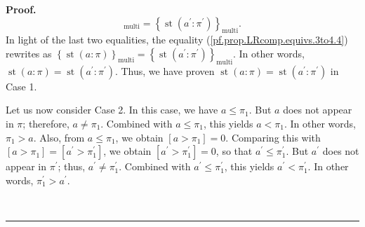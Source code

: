 \documentclass[numbers=enddot,12pt,final,onecolumn,notitlepage]{scrartcl}%
\theoremstyle{definition}
\newenvironment{proof}[1][Proof]{\noindent\textbf{#1.} }{\ \rule{0.5em}{0.5em}}
\newenvironment{verlong}{}{}
\begin{document}
\begin{verlong}
\begin{proof}
\[_{\operatorname*{multi}}=\left\{  \operatorname*{st}\left(  a^{\prime}%
:\pi^{\prime}\right)  \right\}  _{\operatorname*{multi}}.
\]
In light of the last two equalities, the equality
(\ref{pf.prop.LRcomp.equivs.3to4.4}) rewrites as $\left\{  \operatorname*{st}%
\left(  a:\pi\right)  \right\}  _{\operatorname*{multi}}=\left\{
\operatorname*{st}\left(  a^{\prime}:\pi^{\prime}\right)  \right\}
_{\operatorname*{multi}}$. In other words, $\operatorname*{st}\left(
a:\pi\right)  =\operatorname*{st}\left(  a^{\prime}:\pi^{\prime}\right)  $.
Thus, we have proven $\operatorname*{st}\left(  a:\pi\right)
=\operatorname*{st}\left(  a^{\prime}:\pi^{\prime}\right)  $ in Case 1.

Let us now consider Case 2. In this case, we have $a\leq\pi_{1}$. But $a$ does
not appear in $\pi$; therefore, $a\neq\pi_{1}$. Combined with $a\leq\pi_{1}$,
this yields $a<\pi_{1}$. In other words, $\pi_{1}>a$. Also, from $a\leq\pi
_{1}$, we obtain $\left[  a>\pi_{1}\right]  =0$. Comparing this with $\left[
a>\pi_{1}\right]  =\left[  a^{\prime}>\pi_{1}^{\prime}\right]  $, we obtain
$\left[  a^{\prime}>\pi_{1}^{\prime}\right]  =0$, so that $a^{\prime}\leq
\pi_{1}^{\prime}$. But $a^{\prime}$ does not appear in $\pi^{\prime}$; thus,
$a^{\prime}\neq\pi_{1}^{\prime}$. Combined with $a^{\prime}\leq\pi_{1}%
^{\prime}$, this yields $a^{\prime}<\pi_{1}^{\prime}$. In other words,
$\pi_{1}^{\prime}>a^{\prime}$.


\end{proof}
\end{verlong}
\end{document}
